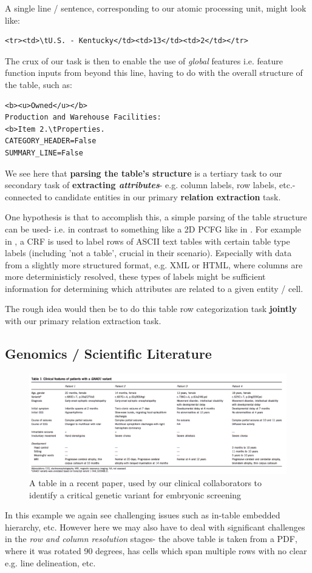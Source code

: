 \documentclass[11pt]{article} %
\begin{document}
A single line / sentence, corresponding to our atomic processing unit, might look like:
\begin{verbatim}
<tr><td>\tU.S. - Kentucky</td><td>13</td><td>2</td></tr>
\end{verbatim} 
The crux of our task is then to enable the use of \textit{global} features i.e. feature function inputs from beyond this line, having to do with the overall structure of the table, such as:
\begin{verbatim}
<b><u>Owned</u></b>
Production and Warehouse Facilities:
<b>Item 2.\tProperties.
CATEGORY_HEADER=False
SUMMARY_LINE=False
\end{verbatim}
We see here that \textbf{parsing the table's structure} is a tertiary task to our secondary task of \textbf{extracting \textit{attributes}}- e.g. column labels, row labels, etc.- connected to candidate entities in our primary \textbf{relation extraction} task.

One hypothesis is that to accomplish this, a simple parsing of the table structure can be used- i.e. in contrast to something like a 2D PCFG like in \cite{Lee_2006}.  For example in \cite{McCallum_2003}, a CRF is used to label rows of ASCII text tables with certain table type labels (including 'not a table', crucial in their scenario).  Especially with data from a slightly more structured format, e.g. XML or HTML, where columns are more deterministicly resolved, these types of labels might be sufficient information for determining which attributes are related to a given entity / cell.

The rough idea would then be to do this table row categorization task \textbf{jointly} with our primary relation extraction task.

\subsection{Genomics / Scientific Literature}
\begin{figure}[h]
    \centering
    \includegraphics[width=1.0\textwidth]{genomics_table_1.png}
    \caption{A table in a recent paper, used by our clinical collaborators to identify a critical genetic variant for embryonic screening}
    \label{fig:genomics_table_1}
\end{figure}
In this example we again see challenging issues such as in-table embedded hierarchy, etc.  However here we may also have to deal with significant challenges in the \textit{row and column resolution} stages- the above table is taken from a PDF, where it was rotated 90 degrees, has cells which span multiple rows with no clear e.g. line delineation, etc.
\end{document}
